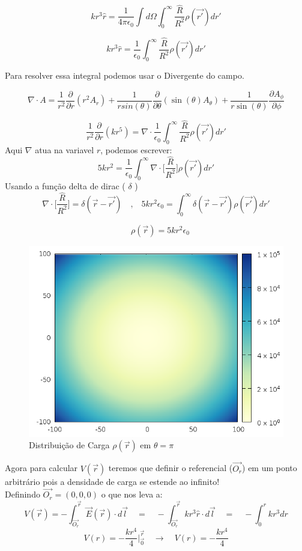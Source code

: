 \documentclass[a4paper,11pt]{exam}
\begin{document}
	\[ kr^3 \hat{r} = \frac{1}{4 \pi \epsilon_0} \int d\Omega \int_{0}^{\infty} \frac{\hat R}{R^2} \rho(\vec{r'}) dr'\]
	
	\[ kr^3 \hat{r} = \frac{1}{\epsilon_0} \int_{0}^{\infty} \frac{\hat R}{R^2} \rho(\vec{r'}) dr'\]
	
	Para resolver essa integral podemos usar o Divergente do campo.
	
	\[\nabla \cdot A = \frac{1}{r^2} \frac{\partial}{\partial r} (r^2 A_r) + \frac{1}{r sin(\theta)} \frac{\partial}{\partial \theta} (\sin(\theta)A_\theta) + \frac{1}{r\sin(\theta)} \frac{\partial A_\phi}{\partial \phi}\]
	
	\[ \frac{1}{r^2} \frac{\partial}{\partial r} (kr^5) = \nabla \cdot \frac{1}{\epsilon_0} \int_{0}^{\infty} \frac{\hat R}{R^2} \rho(\vec{r'}) dr'\]
	Aqui $\nabla$ atua na variavel $r$, podemos escrever:
	\[ 5kr^2 = \frac{1}{\epsilon_0} \int_{0}^{\infty} \nabla \cdot \Bigg[ \frac{\hat R}{R^2} \Bigg] \rho(\vec{r'})  dr'\]
	Usando a função delta de dirac ( $\delta$ )
	\[\nabla \cdot \Bigg[ \frac{\hat R}{R^2} \Bigg] =  \delta(\vec{r} - \vec{r'}) \quad \text{,}  \quad  5kr^2 \epsilon_0 = \int_{0}^{\infty} \delta(\vec{r} - \vec{r'}) \rho(\vec{r'})  dr' \]
	
	\[\quad \rho(\vec{r}) = 5kr^2 \epsilon_0 \]
	
	
	\begin{figure}[h]
		\centering
		\includegraphics[scale=0.6]{Field1.png}
		\caption{Distribuição de Carga $\rho(\vec{r})$ em $\theta=\pi$}
	\end{figure}
	\pagebreak
	Agora para calcular $V(\vec{r})$ teremos que definir o referencial ($\vec{O_r}$) em um ponto arbitrário pois a densidade de carga se estende ao infinito! \\
	\indent Definindo $\vec{O_r} = (0,0,0)$ o que nos leva a:
	\[ V(\vec{r}) = - \int_{\vec{O_r}}^{\vec{r}}  \vec{E}(\vec{r}) \cdot d\vec{l} \quad = \quad - \int_{\vec{O_r}}^{\vec{r}}  kr^3 \hat{r} \cdot d\vec{l} \quad = \quad - \int_{0}^{r}  kr^3 dr\]
	\[ V(r) = - \frac{kr^4}{4}\Bigg|_{\vec{0}}^{\vec{r}} \quad \to \quad V(r) = - \frac{kr^4}{4} \]
	
\end{document}
